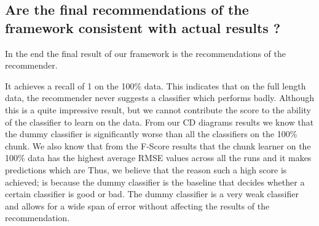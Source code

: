 \subsection{Are the final recommendations of the framework consistent with actual results ?}
\label{SubsectionFinalRecommendation}
In the end the final result of our framework is the recommendations of the recommender.



It achieves a recall of 1 on the 100\% data. This indicates that on the full length data, the recommender never suggests a classifier which performs badly.
Although this is a quite impressive result, but we cannot contribute the score to the ability of the classifier to learn on the data.
From our CD diagrams results we know that the dummy classifier is significantly worse than all the classifiers on the 100\% chunk.
We also know that from the F-Score results that the chunk learner on the 100\% data has the highest average RMSE values across all the runs and it makes predictions which are 
Thus, we believe that the reason such a high score is achieved; is because the dummy classifier is the baseline that decides whether a certain classifier is good or bad.
The dummy classifier is a very weak classifier and allows for a wide span of error without affecting the results of the recommendation.